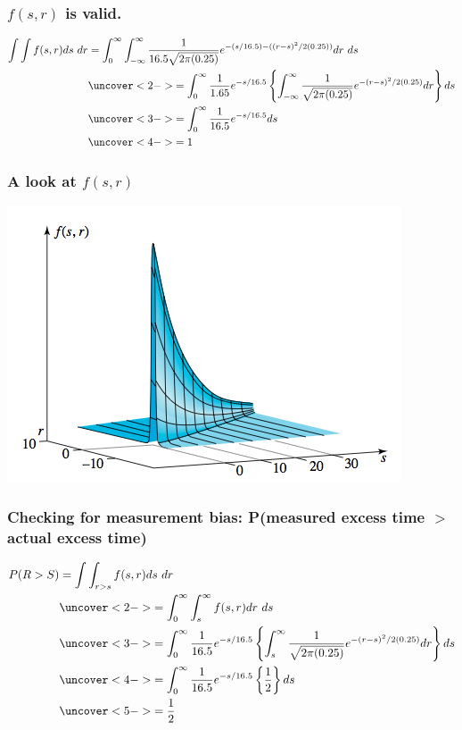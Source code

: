 \documentclass[handout]{beamer}\usepackage[]{graphicx}\usepackage[]{color}
\numberwithin{equation}{section}
\begin{document}
\begin{frame}
\frametitle{$f(s, r)$ is valid.} \scriptsize

\begin{align*}
\int \int f(s, r) ds \ dr &= \int_0^\infty \int_{-\infty}^\infty \frac{1}{16.5 \sqrt{2 \pi (0.25)}} e^{-(s/16.5) - ((r-s)^2/2(0.25))} dr \ ds \\
& \uncover<2->{= \int_0^\infty \frac{1}{1.65} e^{-s/16.5} \left \{ \int_{-\infty}^\infty \frac{1}{\sqrt{2 \pi (0.25)}} e^{-(r-s)^2/2(0.25)} dr \right \} ds} \\
&\uncover<3->{= \int_0^\infty \frac{1}{16.5} e^{-s/16.5} ds} \\
&\uncover<4->{= 1}
\end{align*}
\end{frame}

\begin{frame}
\frametitle{A look at $f(s,r)$}
 \includegraphics{../../fig/salespict.png}
\end{frame}

\begin{frame}
\frametitle{\small Checking for measurement bias: P(measured excess time $>$ actual excess time)} \scriptsize
\begin{align*}
P(R > S) &= \int \int_{r > s} f(s, r) ds \ dr  \\
&\uncover<2->{= \int_0^\infty \int_s^\infty f(s,r) dr \ ds } \\
&\uncover<3->{= \int_0^\infty \frac{1}{16.5} e^{-s/16.5} \left \{ \int_{s}^\infty \frac{1}{\sqrt{2 \pi (0.25)}} e^{-(r-s)^2/2(0.25)} dr \right \} ds} \\
&\uncover<4->{=\int_0^\infty \frac{1}{16.5} e^{-s/16.5} \left \{ \frac{1}{2} \right \} ds} \\
&\uncover<5->{=\frac{1}{2}}
\end{align*}
\end{frame}
\end{document}
